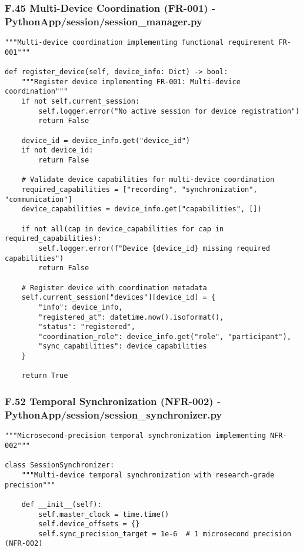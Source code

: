 \documentclass[11pt,a4paper]{article}
\begin{document}
{{\subsubsection{F.45 Multi-Device Coordination (FR-001) - PythonApp/session/session_manager.py}

\begin{verbatim}
"""Multi-device coordination implementing functional requirement FR-001"""

def register_device(self, device_info: Dict) -> bool:
    """Register device implementing FR-001: Multi-device coordination"""
    if not self.current_session:
        self.logger.error("No active session for device registration")
        return False

    device_id = device_info.get("device_id")
    if not device_id:
        return False

    # Validate device capabilities for multi-device coordination
    required_capabilities = ["recording", "synchronization", "communication"]
    device_capabilities = device_info.get("capabilities", [])

    if not all(cap in device_capabilities for cap in required_capabilities):
        self.logger.error(f"Device {device_id} missing required capabilities")
        return False

    # Register device with coordination metadata
    self.current_session["devices"][device_id] = {
        "info": device_info,
        "registered_at": datetime.now().isoformat(),
        "status": "registered",
        "coordination_role": device_info.get("role", "participant"),
        "sync_capabilities": device_capabilities
    }

    return True
\end{verbatim}

\subsubsection{F.52 Temporal Synchronization (NFR-002) - PythonApp/session/session_synchronizer.py}

\begin{verbatim}
"""Microsecond-precision temporal synchronization implementing NFR-002"""

class SessionSynchronizer:
    """Multi-device temporal synchronization with research-grade precision"""

    def __init__(self):
        self.master_clock = time.time()
        self.device_offsets = {}
        self.sync_precision_target = 1e-6  # 1 microsecond precision (NFR-002)


\end{verbatim}}}
\end{document}
